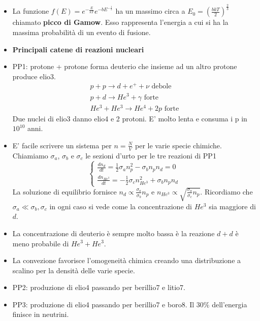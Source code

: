\documentclass[11pt,a4paper]{article}
\begin{document}
\begin{itemize}
\item La funzione $f(E) = e^{-\frac{E}{k T}} e^{- b E^{-\frac{1}{2}}}$ ha un massimo circa a $E_0 = \left( \frac{b k T}{2} \right) ^ {\frac{2}{3}}$ chiamato \textbf{picco di Gamow}. Esso rappresenta l'energia a cui si ha la massima probabilità di un evento di fusione.

\item \textbf{Principali catene di reazioni nucleari}

\item PP1: protone + protone forma deuterio che insieme ad un altro protone produce elio3. 
\begin{gather}
p + p \rightarrow d + e^{+} + \nu \text{  debole} \\
p + d \rightarrow He^{3} + \gamma \text{  forte} \\
He^{3} + He^{3} \rightarrow He^4 + 2p \text{  forte}
\end{gather}
Due nuclei di elio3 danno elio4 e 2 protoni. E' molto lenta e consuma i p in $10^{10}$ anni.

\item E' facile scrivere un sistema per $n = \frac{N}{V}$ per le varie specie chimiche. Chiamiamo $\sigma_{a}$, $\sigma_{b}$ e $\sigma_{c}$ le sezioni d'urto per le tre reazioni di PP1
\begin{equation}
\begin{cases}
\frac{d n_d}{d t} = \frac{1}{2} \sigma_a n_p^2 - \sigma_b n_p n_d = 0 \\
\frac{d n_{He^3}}{d t} = -\frac{1}{2} \sigma_c n_{He^3}^2 + \sigma_b n_p n_d
\end{cases}
\end{equation}
La soluzione di equilibrio fornisce $n_d \propto \frac{\sigma_a}{\sigma_b} n_p$ e $n_{He^3} \propto \sqrt{\frac{\sigma_a}{\sigma_c} n_p}$. Ricordiamo che $\sigma_a \ll \sigma_b, \sigma_c$ in ogni caso si vede come la concentrazione di $He^3$ sia maggiore di $d$. 

\item La concentrazione di deuterio è sempre molto bassa è la reazione $d+d$ è meno probabile di $He^{3}+He^{3}$. 

\item La convezione favorisce l'omogeneità chimica creando una distribuzione a scalino per la densità delle varie specie.

\item PP2: produzione di elio4 passando per berillio7 e litio7.

\item PP3: produzione di elio4 passando per berillio7 e boro8. Il $30\%$ dell'energia finisce in neutrini.


\end{itemize}
\end{document}
